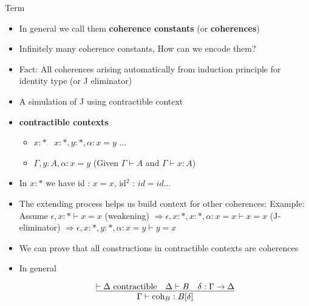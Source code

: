 \documentclass[12pt, mathserif,handout]{beamer}
\begin{document}
\begin{frame}[allowframebreaks,c]{Term}
\begin{itemize}
\begin{itemize}
\hspace{1cm}

\end{itemize}

\item In general we call them \textbf{coherence constants} (or \textbf{coherences})

\item Infinitely many coherence constants, How can we encode them?

\item Fact: All coherences arising automatically from induction principle for identity type (or J eliminator)

\framebreak

\item A simulation of J using contractible context

\item \textbf{contractible contexts}
\begin{itemize}
\item $x:* ~~~~ x : *, y : *, \alpha : x = y$ ...
\item $\Gamma, y: A , \alpha : x = y$ (Given $\Gamma \vdash A$ and
  $\Gamma \vdash x : A$)

\end{itemize}

\item In $x:*$ we have id : $x = x$, id$^2$ : $id = id$...
\item The extending process helps us build context for other coherences:
Example: Assume $\epsilon,x : * \vdash x = x$ (weakening)
$\Rightarrow \epsilon,x : *, x : *, \alpha : x = x \vdash x =
x$ (J-eliminator)
$\Rightarrow \epsilon,x : *, y : *, \alpha : x = y \vdash y = x$

\item We can prove that all constructions in contractible contexts are coherences

\item In general

\begin{equation*}
\infer{\Gamma \vdash \text{coh$_B$} : B [\delta]  }
{\vdash \Delta~ \text{contractible} & \Delta \vdash B & \delta : \Gamma \to \Delta} 
\end{equation*}

\end{itemize}

\end{frame}
\end{document}

